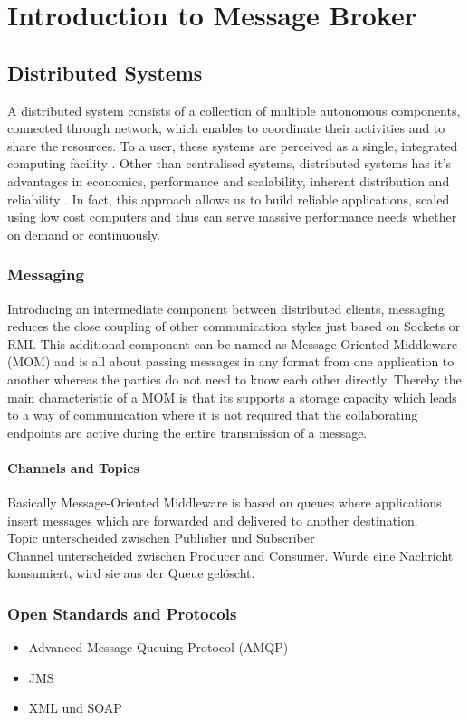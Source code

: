 \chapter{Introduction to Message Broker} 
\section{Distributed Systems} 
A distributed system consists of a collection of multiple autonomous components,
connected through network, which enables to coordinate their activities and to
share the resources. To a user, these systems are perceived as a single,
integrated computing facility \cite{TAN06}. Other than centralised systems,
distributed systems has it's advantages in economics, performance and
scalability, inherent distribution and reliability \cite{POSA1}.
In fact, this approach allows us to build reliable applications, 
scaled using low cost computers and thus can serve massive performance needs 
whether on demand or continuously.

\subsection{Messaging} 
Introducing an intermediate component between distributed
clients, messaging reduces the close coupling of other communication styles just
based on Sockets or RMI. This additional component can be named as
Message-Oriented Middleware (MOM) and is all about passing messages in any
format from one application to another whereas the parties do not need to know
each other directly. Thereby the main characteristic of a MOM is that its
supports a storage capacity which leads to a way of communication where it is
not required that the collaborating endpoints are active during the entire
transmission of a message.\cite{TAN06}
 
\subsubsection{Channels and Topics} 
Basically Message-Oriented Middleware is based on queues where applications insert
messages which are forwarded and delivered to another destination. 
\\ 
Topic unterscheided zwischen Publisher und Subscriber
\\ Channel unterscheided zwischen Producer and Consumer. Wurde eine Nachricht
konsumiert, wird sie aus der Queue gelöscht. 

\subsection{Open Standards and Protocols} 
\begin{itemize} 
	\item Advanced Message Queuing Protocol (AMQP) 
	\item JMS	
	\item XML und SOAP
\end{itemize}

